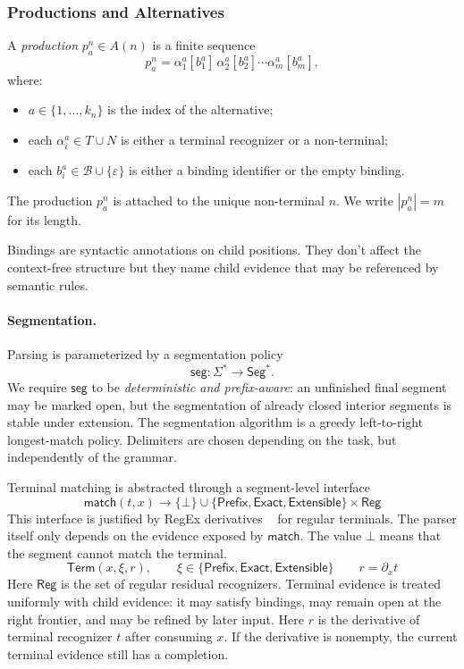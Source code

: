 \subsubsection{Productions and Alternatives}

\begin{definition}[Production]
A \emph{production} \(p^n_a \in A(n)\) is a finite sequence
\[
    p^n_a
    =
    \alpha^a_1[b^a_1]\,
    \alpha^a_2[b^a_2]\cdots
    \alpha^a_m[b^a_m],
\]
where:
\begin{itemize}[nosep]
    \item \(a \in \{1,\ldots,k_n\}\) is the index of the alternative;
    \item each \(\alpha^a_i \in T \cup N\) is either a terminal recognizer or a non-terminal;
    \item each \(b^a_i \in \mathcal{B} \cup \{\varepsilon\}\) is either a binding identifier or the empty binding.
\end{itemize}
The production \(p^n_a\) is attached to the unique non-terminal \(n\). We write $|p^n_a| = m$ for its length.
\end{definition}

Bindings are syntactic annotations on child positions. They don't affect the context-free structure but they name child evidence that may be referenced by semantic rules.

\paragraph{Segmentation.}
Parsing is parameterized by a segmentation policy
\[
    \mathsf{seg}: \Sigma^* \to \mathsf{Seg}^* .
\]
We require \(\mathsf{seg}\) to be \emph{deterministic and prefix-aware}: an
unfinished final segment may be marked open, but the segmentation of already
closed interior segments is stable under extension. The segmentation algorithm
is a greedy left-to-right longest-match policy. Delimiters are chosen depending
on the task, but independently of the grammar. 

Terminal matching is abstracted through a segment-level interface
\[
    \mathsf{match}(t,x)
    \to
    \{\bot\}
    \cup
    \{\mathsf{Prefix},\mathsf{Exact}, \mathsf{Extensible}\} \times \mathsf{Reg}
\]
This interface is justified by RegEx derivatives ~\cite{brzozowski1964derivatives,owens2009regex} for regular terminals. The parser itself only depends on the evidence exposed by \(\mathsf{match}\). The value \(\bot\) means that the segment cannot match the terminal. 
\[
    \mathsf{Term}(x,\xi, r),
    \qquad
    \xi\in\{\mathsf{Prefix},\mathsf{Exact}, \mathsf{Extensible}\}\qquad r = \partial_x t
\]
Here \(\mathsf{Reg}\) is the set of regular residual recognizers. Terminal evidence is treated uniformly with child evidence: it may satisfy bindings, may remain open at the right frontier, and may be refined by later input.
Here \(r\) is the derivative of terminal recognizer \(t\) after
consuming \(x\). If the derivative is nonempty, the current terminal evidence
still has a completion.


